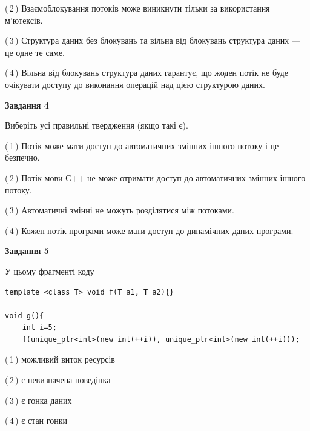 \documentclass[12pt, ukrainian]{article}
\begin{document}
\begin {large}
{(\,2\,) Взаємоблокування потоків може виникнути тільки за використання м’ютексів.%

(\,3\,) Структура даних без блокувань та вільна від блокувань структура даних --- це одне те саме.%

(\,4\,) Вільна від блокувань структура даних гарантує, що жоден потік не буде очікувати доступу до виконання операцій над цією структурою даних.%



\begin{center}
\textbf{Завдання 4}
\end{center}
Виберіть усі правильні твердження (якщо такі є).\par
\vspace{2mm}

(\,1\,) Потік може мати доступ до автоматичних змінних іншого потоку і це безпечно.%

(\,2\,) Потік мови С++ не може отримати доступ до автоматичних змінних іншого потоку.%

(\,3\,) Автоматичні змінні не можуть розділятися між потоками.%

(\,4\,) Кожен потік програми може мати доступ до динамічних даних програми.%



\begin{center}
\textbf{Завдання 5}
\end{center}
У цьому фрагменті коду
\begin{verbatim}
template <class T> void f(T a1, T a2){}

void g(){
    int i=5;
    f(unique_ptr<int>(new int(++i)), unique_ptr<int>(new int(++i)));
\end{verbatim}

(\,1\,) можливий виток ресурсів%

(\,2\,) є невизначена поведінка%

(\,3\,) є гонка даних%

(\,4\,) є стан гонки%


}
\end {large}
\end{document}
